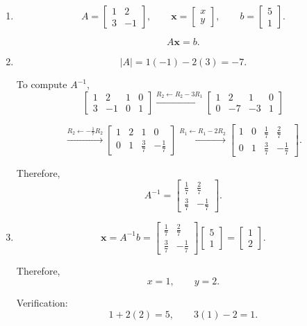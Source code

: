 \documentclass[12pt]{article}
\begin{document}
\begin{enumerate}
    \item[(a)]
    \[
    A=
    \begin{bmatrix}
    1 & 2\\
    3 & -1
    \end{bmatrix},
    \qquad
    \mathbf{x}=
    \begin{bmatrix}
    x\\
    y
    \end{bmatrix},
    \qquad
    b=
    \begin{bmatrix}
    5\\
    1
    \end{bmatrix}.
    \]

    \[
    A\mathbf{x}=b.
    \]
    
    \item[(b)]
    \[
    |A|=1(-1)-2(3)=-7.
    \]
    
    To compute $A^{-1}$,
    \[
    \left[
    \begin{array}{cc|cc}
    1 & 2 & 1 & 0\\
    3 & -1 & 0 & 1
    \end{array}
    \right]
    \xrightarrow{R_2\leftarrow R_2-3R_1}
    \left[
    \begin{array}{cc|cc}
    1 & 2 & 1 & 0\\
    0 & -7 & -3 & 1
    \end{array}
    \right]
    \]
    
    \[
    \xrightarrow{R_2\leftarrow-\frac{1}{7}R_2}
    \left[
    \begin{array}{cc|cc}
    1 & 2 & 1 & 0\\
    0 & 1 & \frac{3}{7} & -\frac{1}{7}
    \end{array}
    \right]
    \xrightarrow{R_1\leftarrow R_1-2R_2}
    \left[
    \begin{array}{cc|cc}
    1 & 0 & \frac{1}{7} & \frac{2}{7}\\
    0 & 1 & \frac{3}{7} & -\frac{1}{7}
    \end{array}
    \right].
    \]
    
    Therefore,
    \[
    A^{-1}
    =
    \begin{bmatrix}
    \frac{1}{7} & \frac{2}{7}\\
    \frac{3}{7} & -\frac{1}{7}
    \end{bmatrix}.
    \]
    
    \item[(c)]
    \[
    \mathbf{x}
    =
    A^{-1}b
    =
    \begin{bmatrix}
    \frac{1}{7} & \frac{2}{7}\\
    \frac{3}{7} & -\frac{1}{7}
    \end{bmatrix}
    \begin{bmatrix}
    5\\
    1
    \end{bmatrix}
    =
    \begin{bmatrix}
    1\\
    2
    \end{bmatrix}.
    \]
    
    Therefore,
    \[
    x=1,\qquad y=2.
    \]
    
    Verification:
    \[
    1+2(2)=5,
    \qquad
    3(1)-2=1.
    \]
\end{enumerate}
\end{document}
